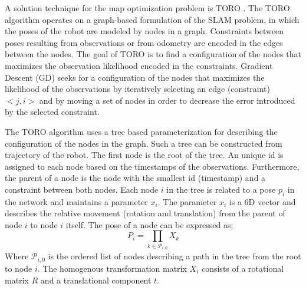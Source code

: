 A solution technique for the map optimization problem is TORO \cite{grisetti2007efficient}.
The TORO algorithm operates on a graph-based formulation of the SLAM problem, in which the poses of the robot are modeled by nodes in a graph.
Constraints between poses resulting from observations or from odometry are encoded in the edges between the nodes.
The goal of TORO is to find a configuration of the nodes that maximizes the observation likelihood encoded in the constraints.
Gradient Descent (GD) \cite{olson2006fast} seeks for a configuration of the nodes that maximizes the likelihood of the observations by iteratively selecting an edge (constraint) $< j, i >$ and by moving a set of nodes
in order to decrease the error introduced by the selected constraint.

\begin{comment}
The nodes are updated according to the following equation: 
\begin{equation}
x^{t + 1} = x^t + \Delta x
\end{equation}
where $x$ is the set of variables describing the locations of the poses in the network, and the term $\Delta x$ is used to move a node in the direction that decreases the error.
The direction of $\Delta x$ is computed from the residual (opposite of the error vector) scaled by the information encoded in the contraint.
In practice, GD decomposes the overall problem into many smaller problems by optimizing the constraints individually.
\end{comment}

The TORO algorithm uses a tree based parameterization for describing the configuration of the nodes in the graph.
Such a tree can be constructed from trajectory of the robot.
The first node is the root of the tree.
An unique id is assigned to each node based on the timestamps of the observations.
Furthermore, the parent of a node is the node with the smallest id (timestamp) and a constraint between both nodes.
Each node $i$ in the tree is related to a pose $p_i$ in the network and maintains a parameter $x_i$.
The parameter $x_i$ is a 6D vector and describes the relative movement (rotation and translation) from the parent of node $i$ to  node $i$ itself.
The pose of a node can be expressed as:
\begin{equation}
P_i = \prod_{k \in \mathcal{P}_{i,0}} X_k
\end{equation}
Where $\mathcal{P}_{i,0}$ is the ordered list of nodes describing a path in the tree from the root to node $i$.
The homogenous transformation matrix $X_i$ consists of a rotational matrix $R$ and a translational component $t$.

